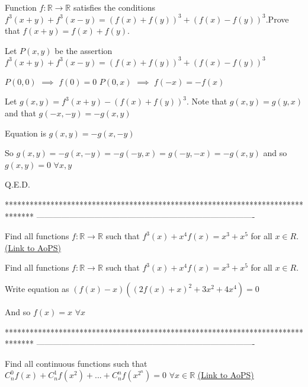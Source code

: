 \begin{solution}
	\begin{tcolorbox}Function $f: \mathbb{R}\to\mathbb{R}$ satisfies the conditions $f^3(x+y)+f^3(x-y)=(f(x)+f(y))^3+(f(x)-f(y))^3$.Prove that $f(x+y)=f(x)+f(y)$.\end{tcolorbox}
Let $P(x,y)$ be the assertion $f^3(x+y)+f^3(x-y)=(f(x)+f(y))^3+(f(x)-f(y))^3$

$P(0,0)$ $\implies$ $f(0)=0$
$P(0,x)$ $\implies$ $f(-x)=-f(x)$

Let $g(x,y)=f^3(x+y)-(f(x)+f(y))^3$. Note that $g(x,y)=g(y,x)$ and that $g(-x,-y)=-g(x,y)$

Equation is $g(x,y)=-g(x,-y)$

So $g(x,y)=-g(x,-y)=-g(-y,x)=g(-y,-x)=-g(x,y)$ and so $g(x,y)=0$ $\forall x,y$

Q.E.D.
\end{solution}
*******************************************************************************
-------------------------------------------------------------------------------

\begin{problem}
	Find all functions $f: \mathbb{R}\to\mathbb{R}$ such that $f^3(x)+x^4f(x)=x^3+x^5$ for all $x{\in}R$.
	\flushright \href{https://artofproblemsolving.com/community/c6h567465}{(Link to AoPS)}
\end{problem}



\begin{solution}
	\begin{tcolorbox}Find all functions $f: \mathbb{R}\to\mathbb{R}$ such that $f^3(x)+x^4f(x)=x^3+x^5$ for all $x{\in}R$.\end{tcolorbox}
Write equation as $(f(x)-x)((2f(x)+x)^2+3x^2+4x^4)=0$

And so $\boxed{f(x)=x}$ $\forall x$
\end{solution}
*******************************************************************************
-------------------------------------------------------------------------------

\begin{problem}
	Find all continuous functions such that
$C_{n}^{0}f(x)+C_{n}^{1}f(x^2)+...+C_{n}^{n}f(x^{2^n})=0$ $\forall x\in \mathbb{R}$
	\flushright \href{https://artofproblemsolving.com/community/c6h567477}{(Link to AoPS)}
\end{problem}



